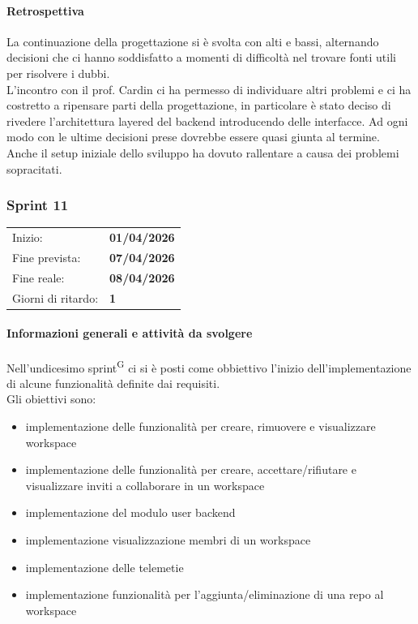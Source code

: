 \documentclass[a4paper, 11pt]{article}
\newcommand{\subsubsubsection}[1]{\paragraph{#1}}
\begin{document}
\subsubsubsection{Retrospettiva}
La continuazione della progettazione si è svolta con alti e bassi, alternando decisioni che ci hanno soddisfatto a momenti di difficoltà nel trovare fonti utili per risolvere i dubbi.\\ L'incontro con il prof. Cardin ci ha permesso di individuare altri problemi e ci ha costretto a ripensare parti della progettazione, in particolare è stato deciso di rivedere l'architettura layered del backend introducendo delle interfacce. Ad ogni modo con le ultime decisioni prese dovrebbe essere quasi giunta al termine. \\Anche il setup iniziale dello sviluppo ha dovuto rallentare a causa dei problemi sopracitati.\\









\newpage

\subsubsection{Sprint 11}
\begin{tabular}{ll}
	Inizio: & \textbf{01/04/2026} \\
	Fine prevista: & \textbf{07/04/2026} \\
	Fine reale: & \textbf{08/04/2026} \\
	Giorni di ritardo: & \textbf{1} \\
\end{tabular}


\subsubsubsection{Informazioni generali e attività da svolgere}
Nell'undicesimo sprint\textsuperscript{G} ci si è posti come obbiettivo l'inizio dell'implementazione di alcune funzionalità definite dai requisiti.\\
Gli obiettivi sono:
\begin{itemize}
	\item implementazione delle funzionalità per creare, rimuovere e visualizzare workspace
	\item implementazione delle funzionalità per creare, accettare/rifiutare e visualizzare inviti a collaborare in un workspace
	\item implementazione del modulo user backend
	\item implementazione visualizzazione membri di un workspace
	\item implementazione delle telemetie
	\item implementazione funzionalità per l'aggiunta/eliminazione di una repo al workspace
\end{itemize}
\end{document}
